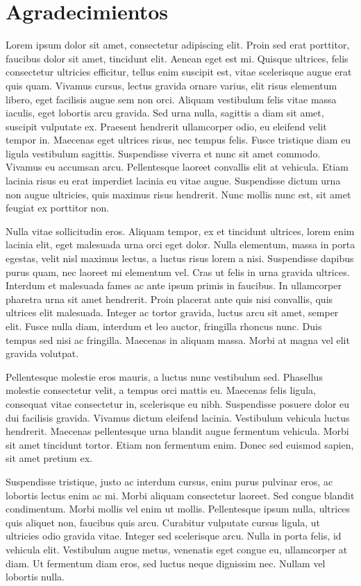 \section*{Agradecimientos}

Lorem ipsum dolor sit amet, consectetur adipiscing elit. Proin sed erat porttitor, faucibus dolor sit amet, tincidunt elit. Aenean eget est mi. Quisque ultrices, felis consectetur ultricies efficitur, tellus enim suscipit est, vitae scelerisque augue erat quis quam. Vivamus cursus, lectus gravida ornare varius, elit risus elementum libero, eget facilisis augue sem non orci. Aliquam vestibulum felis vitae massa iaculis, eget lobortis arcu gravida. Sed urna nulla, sagittis a diam sit amet, suscipit vulputate ex. Praesent hendrerit ullamcorper odio, eu eleifend velit tempor in. Maecenas eget ultrices risus, nec tempus felis. Fusce tristique diam eu ligula vestibulum sagittis. Suspendisse viverra et nunc sit amet commodo. Vivamus eu accumsan arcu. Pellentesque laoreet convallis elit at vehicula. Etiam lacinia risus eu erat imperdiet lacinia eu vitae augue. Suspendisse dictum urna non augue ultricies, quis maximus risus hendrerit. Nunc mollis nunc est, sit amet feugiat ex porttitor non.

Nulla vitae sollicitudin eros. Aliquam tempor, ex et tincidunt ultrices, lorem enim lacinia elit, eget malesuada urna orci eget dolor. Nulla elementum, massa in porta egestas, velit nisl maximus lectus, a luctus risus lorem a nisi. Suspendisse dapibus purus quam, nec laoreet mi elementum vel. Cras ut felis in urna gravida ultrices. Interdum et malesuada fames ac ante ipsum primis in faucibus. In ullamcorper pharetra urna sit amet hendrerit. Proin placerat ante quis nisi convallis, quis ultrices elit malesuada. Integer ac tortor gravida, luctus arcu sit amet, semper elit. Fusce nulla diam, interdum et leo auctor, fringilla rhoncus nunc. Duis tempus sed nisi ac fringilla. Maecenas in aliquam massa. Morbi at magna vel elit gravida volutpat.

Pellentesque molestie eros mauris, a luctus nunc vestibulum sed. Phasellus molestie consectetur velit, a tempus orci mattis eu. Maecenas felis ligula, consequat vitae consectetur in, scelerisque eu nibh. Suspendisse posuere dolor eu dui facilisis gravida. Vivamus dictum eleifend lacinia. Vestibulum vehicula luctus hendrerit. Maecenas pellentesque urna blandit augue fermentum vehicula. Morbi sit amet tincidunt tortor. Etiam non fermentum enim. Donec sed euismod sapien, sit amet pretium ex.

Suspendisse tristique, justo ac interdum cursus, enim purus pulvinar eros, ac lobortis lectus enim ac mi. Morbi aliquam consectetur laoreet. Sed congue blandit condimentum. Morbi mollis vel enim ut mollis. Pellentesque ipsum nulla, ultrices quis aliquet non, faucibus quis arcu. Curabitur vulputate cursus ligula, ut ultricies odio gravida vitae. Integer sed scelerisque arcu. Nulla in porta felis, id vehicula elit. Vestibulum augue metus, venenatis eget congue eu, ullamcorper at diam. Ut fermentum diam eros, sed luctus neque dignissim nec. Nullam vel lobortis nulla.

